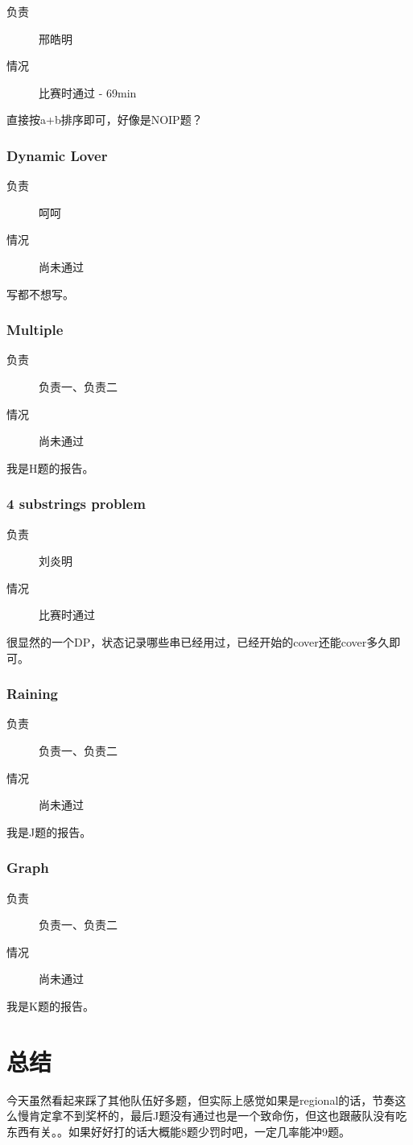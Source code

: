 \documentclass[a4paper, 11pt, nofonts, nocap, fancyhdr]{ctexart}
\newcommand{\problem}[1]{\subsubsection{#1}}
\begin{document}
\begin{description}
\item[负责] 邢皓明
\item[情况] 比赛时通过 - 69min
\end{description}

直接按a+b排序即可，好像是NOIP题？

\problem{Dynamic Lover}

\begin{description}
\item[负责] 呵呵
\item[情况] 尚未通过
\end{description}

写都不想写。


\problem{Multiple}

\begin{description}
\item[负责] 负责一、负责二
\item[情况] 尚未通过
\end{description}

我是H题的报告。

\problem{4 substrings problem}

\begin{description}
\item[负责] 刘炎明
\item[情况] 比赛时通过
\end{description}

很显然的一个DP，状态记录哪些串已经用过，已经开始的cover还能cover多久即可。


\problem{Raining}

\begin{description}
\item[负责] 负责一、负责二
\item[情况] 尚未通过
\end{description}

我是J题的报告。



\problem{Graph}

\begin{description}
\item[负责] 负责一、负责二
\item[情况] 尚未通过
\end{description}

我是K题的报告。

\section{总结}

今天虽然看起来踩了其他队伍好多题，但实际上感觉如果是regional的话，节奏这么慢肯定拿不到奖杯的，最后J题没有通过也是一个致命伤，但这也跟蔽队没有吃东西有关。。如果好好打的话大概能8题少罚时吧，一定几率能冲9题。
\end{document}
